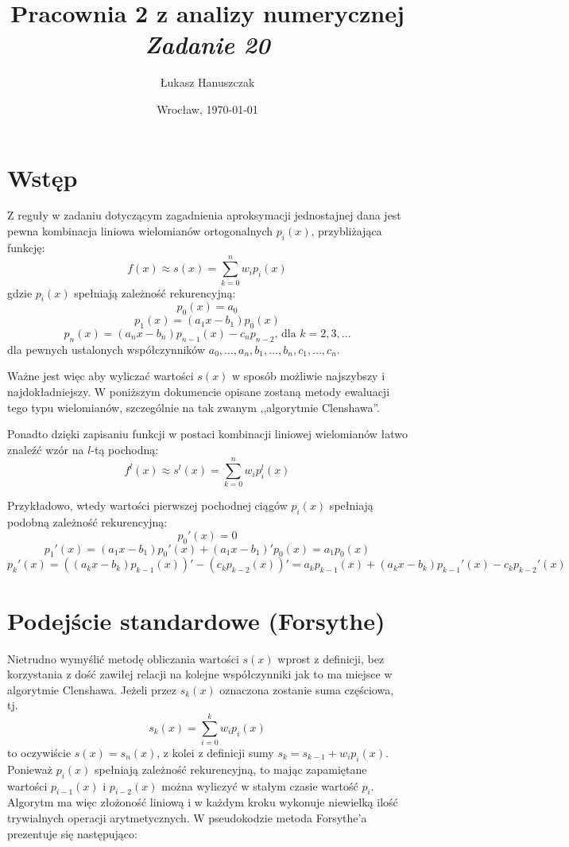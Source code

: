 \documentclass[11pt,leqno]{article}
\title{
  \textbf{Pracownia 2 z analizy numerycznej}\\
  \textit{Zadanie 20}
}
\author{Łukasz Hanuszczak}
\date{Wrocław, \today}
\begin{document}
\maketitle


\section{Wstęp}
Z reguły w zadaniu dotyczącym zagadnienia aproksymacji jednostajnej dana jest pewna kombinacja liniowa wielomianów ortogonalnych $p_i(x)$, przybliżająca funkcję:
\begin{equation} \label{eq:psum}
  f(x) \approx s(x) = \sum_{k = 0}^n w_i p_i(x)
\end{equation}
gdzie $p_i(x)$ spełniają zależność rekurencyjną:
\[ p_0(x) = a_0 \]
\begin{equation} \label{eq:prec}
p_1(x) = (a_1 x - b_1) p_0(x)
\end{equation}
\[ p_n(x) = (a_n x - b_n) p_{n - 1}(x) - c_n p_{n - 2} \text{, dla } k = 2, 3, \dots \]
dla pewnych ustalonych współczynników $a_0, \dots, a_n, b_1, \dots, b_n, c_1, \dots, c_n$.

Ważne jest więc aby wyliczać wartości $s(x)$ w sposób możliwie najszybszy i najdokładniejszy. W poniższym dokumencie opisane zostaną metody ewaluacji tego typu wielomianów, szczególnie na tak zwanym ,,algorytmie Clenshawa''.

Ponadto dzięki zapisaniu funkcji w postaci kombinacji liniowej wielomianów łatwo znaleźć wzór na $l$-tą pochodną:
\[
  f^l(x) \approx s^l(x) = \sum_{k = 0}^n w_i p_i^l(x)
\]

Przykładowo, wtedy wartości pierwszej pochodnej ciągów $p_i(x)$ spełniają podobną zależność rekurencyjną:
\[ p_0'(x) = 0 \]
\begin{equation} \label{eq:pprec}
p_1'(x) = (a_1 x - b_1) p_0'(x) + (a_1 x - b_1)' p_0(x) = a_1 p_0(x)
\end{equation}
\[ 
  p_k'(x)
  =
  ((a_k x - b_k) p_{k - 1}(x))' - (c_k p_{k - 2}(x))'
  =
  a_k p_{k - 1}(x) + (a_k x - b_k) p_{k - 1}'(x) - c_k p_{k - 2}'(x)
\]



\section{Podejście standardowe (Forsythe)}
Nietrudno wymyślić metodę obliczania wartości $s(x)$ wprost z definicji, bez korzystania z dość zawiłej relacji na kolejne współczynniki jak to ma miejsce w algorytmie Clenshawa. Jeżeli przez $s_k(x)$ oznaczona zostanie suma częściowa, tj.
\[ s_k(x) = \sum_{i = 0}^k w_i p_i(x) \]
to oczywiście $s(x) = s_n(x)$, z kolei z definicji sumy $s_k = s_{k - 1} + w_i p_i(x) $. Ponieważ $p_i(x)$ spełniają zależność rekurencyjną, to mając zapamiętane wartości $p_{i - 1}(x)$ i $p_{i - 2}(x)$ można wyliczyć w stałym czasie wartość $p_i$. Algorytm ma więc złożoność liniową i w każdym kroku wykonuje niewielką ilość trywialnych operacji arytmetycznych. W pseudokodzie metoda Forsythe'a prezentuje się następująco:
\end{document}
